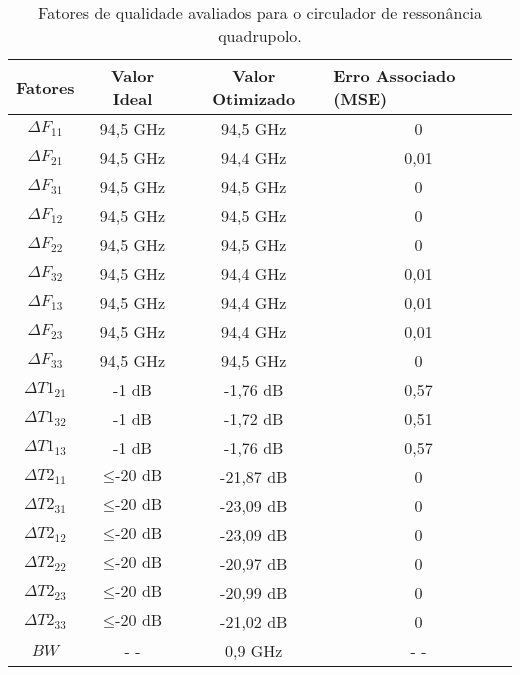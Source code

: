 



\begin{table}[H]
    \centering
    \caption{Fatores de qualidade avaliados para o circulador de ressonância quadrupolo.}
    \begin{tabular}{cccc}
\hline
Fatores          & Valor Ideal            & Valor Otimizado & \multicolumn{1}{l}{Erro Associado (MSE)} \\ \hline
$\Delta F_{11}$  & 94,5 GHz               & 94,5 GHz        & 0                                        \\
$\Delta F_{21}$  & 94,5 GHz               & 94,4 GHz        & 0,01                                     \\
$\Delta F_{31}$  & 94,5 GHz               & 94,5 GHz        & 0                                        \\
$\Delta F_{12}$  & 94,5 GHz               & 94,5 GHz        & 0                                        \\
$\Delta F_{22}$  & 94,5 GHz               & 94,5 GHz        & 0                                        \\
$\Delta F_{32}$  & 94,5 GHz               & 94,4 GHz        & 0,01                                     \\
$\Delta F_{13}$  & 94,5 GHz               & 94,4 GHz        & 0,01                                     \\
$\Delta F_{23}$  & 94,5 GHz               & 94,4 GHz        & 0,01                                     \\
$\Delta F_{33}$  & 94,5 GHz               & 94,5 GHz        & 0                                        \\
$\Delta T1_{21}$ & -1 dB                  & -1,76 dB        & 0,57                                     \\
$\Delta T1_{32}$ & -1 dB                  & -1,72 dB        & 0,51                                     \\
$\Delta T1_{13}$ & -1 dB                  & -1,76 dB        & 0,57                                     \\
$\Delta T2_{11}$ & $\leq \textrm{-20 dB}$ & -21,87 dB       & 0                                        \\
$\Delta T2_{31}$ & $\leq \textrm{-20 dB}$ & -23,09 dB       & 0                                        \\
$\Delta T2_{12}$ & $\leq \textrm{-20 dB}$ & -23,09 dB       & 0                                        \\
$\Delta T2_{22}$ & $\leq \textrm{-20 dB}$ & -20,97 dB       & 0                                        \\
$\Delta T2_{23}$ & $\leq \textrm{-20 dB}$ & -20,99 dB       & 0                                        \\
$\Delta T2_{33}$ & $\leq \textrm{-20 dB}$ & -21,02 dB       & 0                                        \\
$BW$             & - -                    & 0,9 GHz         & - -                                      \\ \hline
\end{tabular}


\end{table}
